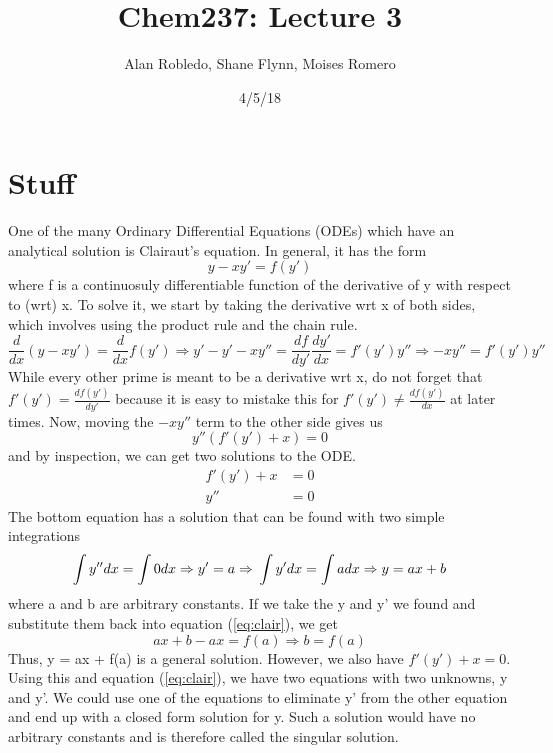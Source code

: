 \documentclass{article}
\title{Chem237: Lecture 3}
\date{4/5/18}
\author{Alan Robledo, Shane Flynn, Moises Romero}
\newcommand{\be}{\begin{equation}}
\newcommand{\ee}{\end{equation}}
\begin{document}
\maketitle
\section*{Stuff}
One of the many Ordinary Differential Equations (ODEs) which have an analytical solution is Clairaut's equation.
In general, it has the form
\be \label{eq:clair}
y - x y' = f(y')
\ee
where f is a continuosuly differentiable function of the derivative of y with respect to (wrt) x.
To solve it, we start by taking the derivative wrt x of both sides, which involves using the product rule and the chain rule.
\be
\frac{d}{dx} (y - x y') = \frac{d}{dx}f(y') \Rightarrow y' - y' - xy'' = \frac{df}{dy'} \frac{dy'}{dx} = f'(y') y''
\Rightarrow -xy'' = f'(y') y''
\ee
While every other prime is meant to be a derivative wrt x, do not forget that $f'(y') = \frac{df(y')}{dy'}$ because it is easy to mistake this for $f'(y') \neq \frac{df(y')}{dx}$ at later times.
Now, moving the $-xy''$ term to the other side gives us
\be
y''(f'(y') + x) = 0
\ee
and by inspection, we can get two solutions to the ODE.
\be
\begin{split}
f'(y') + x &= 0 \\
y'' &= 0
\end{split}
\ee
The bottom equation has a solution that can be found with two simple integrations
\be
\int y'' dx = \int 0 dx \Rightarrow y' = a \Rightarrow \\
\int y' dx = \int a dx \Rightarrow y = ax + b
\ee
where a and b are arbitrary constants.
If we take the y and y' we found and substitute them back into equation (\ref{eq:clair}), we get
\be
ax + b - ax = f(a) \Rightarrow b = f(a)
\ee
Thus, y = ax + f(a) is a general solution.
However, we also have $f'(y') + x = 0$.
Using this and equation (\ref{eq:clair}), we have two equations with two unknowns, y and y'.
We could use one of the equations to eliminate y' from the other equation and end up with a closed form solution for y.
Such a solution would have no arbitrary constants and is therefore called the singular solution.
\end{document}
